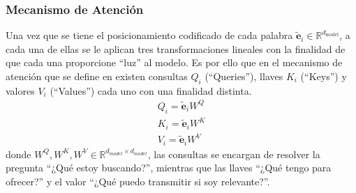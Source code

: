 \documentclass[12pt,letterpaper]{article}
\begin{document}
\subsubsection{Mecanismo de Atención}
Una vez que se tiene el posicionamiento codificado de cada palabra $\tilde{\textbf{e}}_i \in \mathbb{R}^{d_{\text{model}}}$, a cada una de ellas se le aplican tres transformaciones lineales con la finalidad de que cada una proporcione ``luz'' al modelo. Es por ello que en el mecanismo de atención que se define en \cite{vaswani2017attention} existen consultas $Q_i$ (``Queries''), llaves $K_i$ (``Keys'') y valores $V_i$ (``Values'') cada uno con una finalidad distinta.
\begin{gather}
    Q_i = \tilde{\textbf{e}}_i W^Q\\
    K_i = \tilde{\textbf{e}}_i W^K\\
     V_i = \tilde{\textbf{e}}_i W^V
\end{gather}
donde $W^Q, W^K, W^V\in \mathbb{R}^{d_{model}\times d_{model}}$, las consultas se encargan de resolver la pregunta ``¿Qué estoy buscando?'', mientras que las llaves ``¿Qué tengo para ofrecer?'' y el valor ``¿Qué puedo transmitir si soy relevante?''. 
\end{document}
